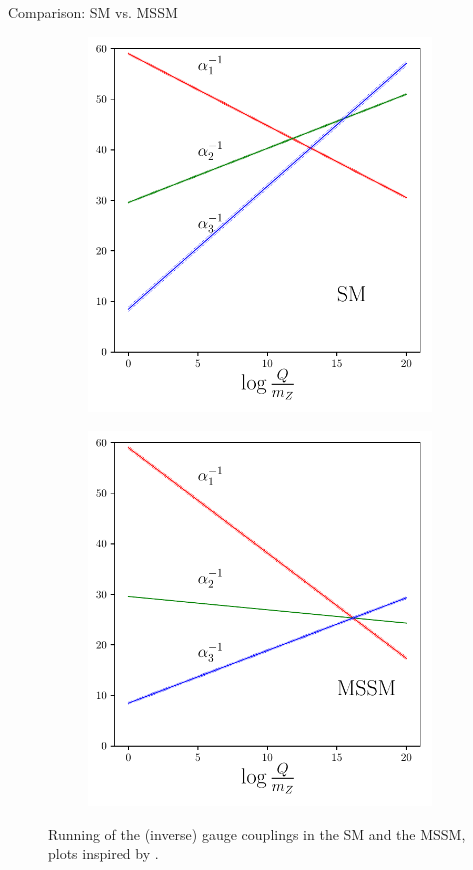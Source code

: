 \begin{frame}{Comparison: SM vs. MSSM}
	\begin{figure}
	\begin{subfigure}
		\centering
	\includegraphics[scale = 0.55]{figures/dgut-1}
	\end{subfigure}
	\begin{subfigure}
		\centering
	\includegraphics[scale = 0.55]{figures/dgut-2}
	\end{subfigure}

	\caption{Running of the (inverse) gauge couplings in the SM and the MSSM, plots inspired by \cite{Kazakov2000}.}
	\end{figure}
\end{frame}


